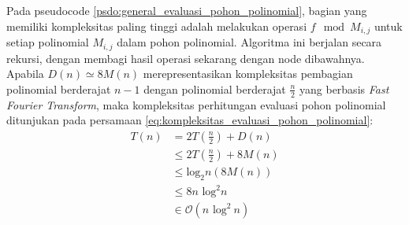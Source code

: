 Pada pseudocode \ref{psdo:general_evaluasi_pohon_polinomial}, bagian yang memiliki kompleksitas paling tinggi adalah melakukan operasi $ f \mod{M_{i,j}} $ untuk setiap polinomial $ M_{i,j} $ dalam pohon polinomial. Algoritma ini berjalan secara rekursi, dengan membagi hasil operasi sekarang dengan node dibawahnya. Apabila $ D(n) \simeq 8M(n) $ merepresentasikan kompleksitas pembagian polinomial berderajat $ n - 1 $ dengan polinomial berderajat $ \frac{n}{2} $ yang berbasis \textit{Fast Fourier Transform}, maka kompleksitas perhitungan evaluasi pohon polinomial ditunjukan pada persamaan \eqref{eq:kompleksitas_evaluasi_pohon_polinomial}:
\begin{equation}
	\begin{aligned}
		T(n) &= 2T(\frac{n}{2}) + D(n) \\
			 &\leq 2T(\frac{n}{2}) + 8M(n) \\
			 &\leq \text{log}_2 n(8M(n)) \\
			 &\leq 8n\text{ log}^2 n \\
			 &\in \mathcal{O}{(n \text{ log}^2\ n)} \\
	\end{aligned}
	\label{eq:kompleksitas_evaluasi_pohon_polinomial}
\end{equation}

